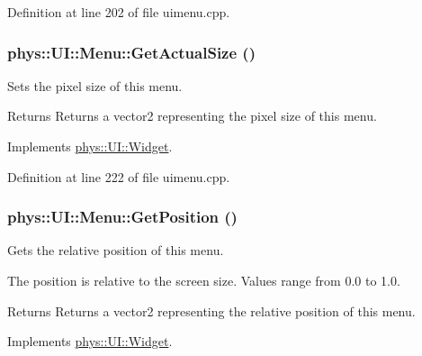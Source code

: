 Definition at line 202 of file uimenu.cpp.

\hypertarget{classphys_1_1UI_1_1Menu_af7566b83c50a4a02ac78d174d7c61817}{
\subsubsection[{GetActualSize}]{ phys::UI::Menu::GetActualSize ()}}
\label{d6/dd3/classphys_1_1UI_1_1Menu_af7566b83c50a4a02ac78d174d7c61817}


Sets the pixel size of this menu. 

\begin{DoxyReturn}{Returns}
Returns a vector2 representing the pixel size of this menu. 
\end{DoxyReturn}


Implements \hyperlink{classphys_1_1UI_1_1Widget_af3a685621ed220748c0940ea38c96ed2}{phys::UI::Widget}.



Definition at line 222 of file uimenu.cpp.

\hypertarget{classphys_1_1UI_1_1Menu_a3c19fe2596fe4049325cc580daa70387}{
\subsubsection[{GetPosition}]{ phys::UI::Menu::GetPosition ()}}
\label{d6/dd3/classphys_1_1UI_1_1Menu_a3c19fe2596fe4049325cc580daa70387}


Gets the relative position of this menu. 

The position is relative to the screen size. Values range from 0.0 to 1.0. \begin{DoxyReturn}{Returns}
Returns a vector2 representing the relative position of this menu. 
\end{DoxyReturn}


Implements \hyperlink{classphys_1_1UI_1_1Widget_a3e464b028b0d1b5755923b8790260c33}{phys::UI::Widget}.



